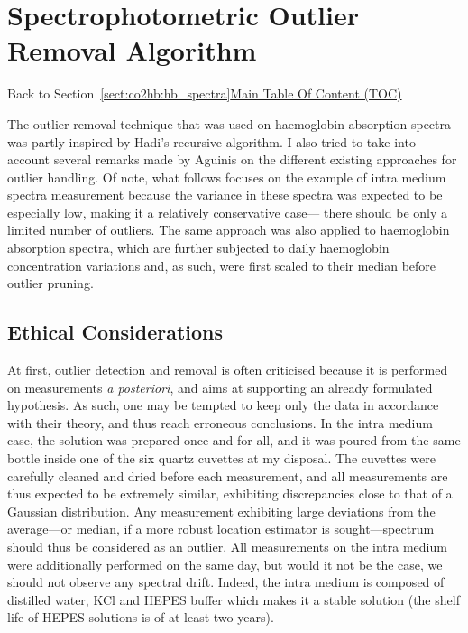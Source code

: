 \chapter{Spectrophotometric Outlier Removal Algorithm}\label{app:pruning_algo}

\begin{appbox}
	Back to Section~\ref{sect:co2hb:hb_spectra}\hfill \hyperref[chapter:toc]{Main Table Of Content (TOC)}
\end{appbox}

The outlier removal technique that was used on haemoglobin absorption spectra was partly inspired by Hadi's recursive algorithm\cite{hadi1992}. I also tried to take into account several remarks made by Aguinis \etal{}\cite{aguinis2013} on the different existing approaches for outlier handling. Of note, what follows focuses on the example of intra medium spectra measurement because the variance in these spectra was expected to be especially low, making it a relatively conservative case---\ie{} there should be only a limited number of outliers. The same approach was also applied to haemoglobin absorption spectra, which are further subjected to daily haemoglobin concentration variations\cite{ward1904} and, as such, were first scaled to their median before outlier pruning.

\section{Ethical Considerations}

At first, outlier detection and removal is often criticised because it is performed on measurements \textit{a posteriori}, and aims at supporting an already formulated hypothesis. As such, one may be tempted to keep only the data in accordance with their theory, and thus reach erroneous conclusions\cite{stefan2023}. In the intra medium case, the solution was prepared once and for all, and it was poured from the same bottle inside one of the six quartz cuvettes at my disposal. The cuvettes were carefully cleaned and dried before each measurement, and all measurements are thus expected to be extremely similar, exhibiting discrepancies close to that of a Gaussian distribution. Any measurement exhibiting large deviations from the average---or median, if a more robust location estimator is sought---spectrum should thus be considered as an outlier. All measurements on the intra medium were additionally performed on the same day, but would it not be the case, we should not observe any spectral drift. Indeed, the intra medium is composed of distilled water, KCl and HEPES buffer which makes it a stable solution (the shelf life of HEPES solutions is of at least two years\cite{hepes_shelf}).

